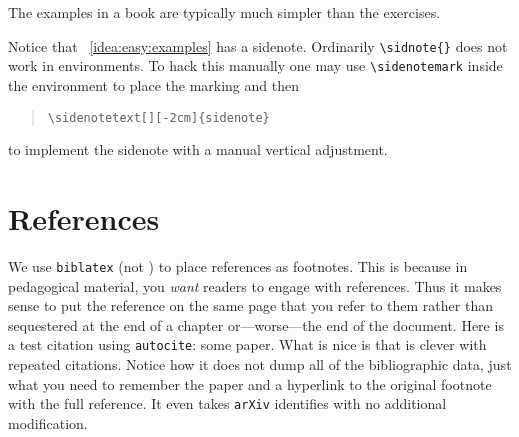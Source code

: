 \begin{bigidea}
\label{idea:easy:examples}
The examples in a book are typically much simpler than the exercises.\sidenotemark
\end{bigidea}

\noindent  Notice that \bigidearef{}~\ref{idea:easy:examples} has a sidenote. Ordinarily \verb!\sidnote{}! does not work in environments. To hack this manually one may use \verb!\sidenotemark! inside the environment to place the marking and then 
\begin{quotation}
\verb!\sidenotetext[][-2cm]{sidenote}!
\end{quotation}
to implement the sidenote with a manual vertical adjustment.



\section{References}

We use \texttt{biblatex} (not \BibTeX{}) to place references as footnotes. This is because in pedagogical material, you \emph{want} readers to engage with references. Thus it makes sense to put the reference on the same page that you refer to them rather than sequestered at the end of a chapter or---worse---the end of the document. Here is a test citation using \texttt{autocite}: some paper.\autocite{Feng:2016ijc} What is nice is that \BibLaTeX{} is clever with repeated citations.\autocite{Feng:2016ijc} Notice how it does not dump all of the bibliographic data, just what you need to remember the paper and a hyperlink to the original footnote with the full reference. It even takes \texttt{arXiv} identifies with no additional modification.

